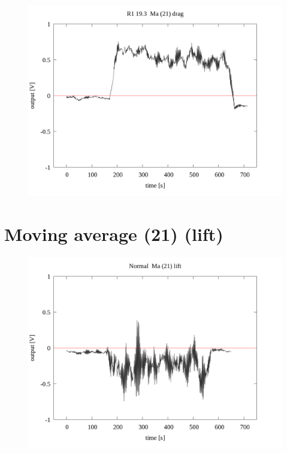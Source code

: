 \documentclass[a4paper]{jsarticle}
\begin{document}
\begin{figure}[htbp]
    \footnotesize
    \begin{center}
        \includegraphics[width=140mm]{../../../33_result/210806/moving_average/21/drag/R1_19.3_ma(21)_drag.png}
    \end{center}
\end{figure}

\section{Moving average (21) (lift)}

\begin{figure}[htbp]
    \footnotesize
    \begin{center}
        \includegraphics[width=140mm]{../../../33_result/210806/moving_average/21/lift/Normal_ma(21)_lift.png}
    \end{center}
\end{figure}
\end{document}
